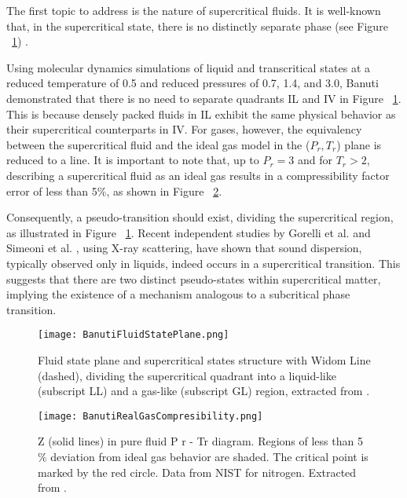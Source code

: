 	The first topic to address is the nature of supercritical fluids. It is
	well-known that, in the supercritical state, there is no distinctly separate
	phase (see Figure ~\ref{Banuti fluid state plane}) \cite{mcmillan2010going}.

	Using molecular dynamics simulations of liquid and transcritical states at a
	reduced temperature of 0.5 and reduced pressures of 0.7, 1.4, and 3.0,
	Banuti ~\cite{banuti2017seven} demonstrated that there is no need to
	separate quadrants IL and IV in Figure ~\ref{Banuti fluid state plane}. This
	is because densely packed fluids in IL exhibit the same physical behavior as
	their supercritical counterparts in IV. For gases, however, the equivalency
	between the supercritical fluid and the ideal gas model in the ($P_r,T_r$)
	plane is reduced to a line. It is important to note that, up to $P_r=3$ and
	for $T_r>2$, describing a supercritical fluid as an ideal gas results in a
	compressibility factor error of less than 5$\%$, as shown in Figure
	~\ref{BanutiRealGasCompresibility}.

	Consequently, a pseudo-transition should exist, dividing the supercritical
	region, as illustrated in Figure ~\ref{Banuti fluid state plane}. Recent
	independent studies by Gorelli et al. \cite{gorelli2006liquidlike} and
	Simeoni et al. \cite{simeoni2010widom}, using X-ray scattering, have shown
	that sound dispersion, typically observed only in liquids, indeed occurs in
	a supercritical transition. This suggests that there are two distinct
	pseudo-states within supercritical matter, implying the existence of a
	mechanism analogous to a subcritical phase transition.

	\begin{figure}[h!]
		\centering
		\texttt{[image: BanutiFluidStatePlane.png]}
		\caption{Fluid state plane and supercritical states structure with Widom
		Line (dashed), dividing the supercritical quadrant into a liquid-like
		(subscript LL) and a gas-like (subscript GL) region, extracted from
		\cite{banuti2017seven}.}
		\label{Banuti fluid state plane}
	\end{figure}


	\begin{figure}[h!]
		\centering
		\texttt{[image: BanutiRealGasCompresibility.png]}
		\caption{Z (solid lines) in pure fluid P r - Tr diagram. Regions of less
		than 5$\%$
		deviation from ideal gas behavior are shaded. The critical point is
		marked by the red circle. Data from NIST
		\cite{burgess2012thermochemical} for nitrogen. Extracted from
		\cite{banuti2017seven}.}
    \label{BanutiRealGasCompresibility}
	\end{figure}

